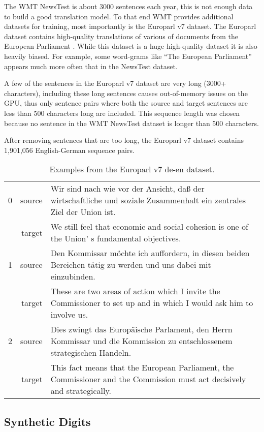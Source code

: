 The WMT NewsTest is about 3000 sentences each year, this is not enough data to build a good translation model. To that end WMT provides additional datasets for training, most importantly is the Europarl v7 dataset. The Europarl dataset contains high-quality translations of various of documents from the European Parliament \cite{europarl}. While this dataset is a huge high-quality dataset it is also heavily biased. For example, some word-grams like ``The European Parliament'' appears much more often that in the NewsTest dataset.

A few of the sentences in the Europarl v7 dataset are very long (3000+ characters), including these long sentences causes out-of-memory issues on the GPU, thus only sentence pairs where both the source and target sentences are less than 500 characters long are included. This sequence length was chosen because no sentence in the WMT NewsTest dataset is longer than 500 characters.

After removing sentences that are too long, the Europarl v7 dataset contains 1,901,056 English-German sequence pairs.

\begin{table}[H]
\centering
\begin{tabular}{l|r|p{10cm}}
        0 & source & Wir sind nach wie vor der Ansicht, daß der wirtschaftliche und soziale Zusammenhalt ein zentrales Ziel der Union ist. \\[0.1cm]
          & target & We still feel that economic and social cohesion is one of the Union' s fundamental objectives. \\[0.1cm] \hline
        1 & source & Den Kommissar möchte ich auffordern, in diesen beiden Bereichen tätig zu werden und uns dabei mit einzubinden. \\[0.1cm]
          & target & These are two areas of action which I invite the Commissioner to set up and in which I would ask him to involve us. \\[0.1cm] \hline
        2 & source & Dies zwingt das Europäische Parlament, den Herrn Kommissar und die Kommission zu entschlossenem strategischen Handeln. \\[0.1cm]
          & target & This fact means that the European Parliament, the Commissioner and the Commission must act decisively and strategically.
\end{tabular}
\caption{Examples from the Europarl v7 de-en dataset.}
\end{table}

\subsection{Synthetic Digits}

